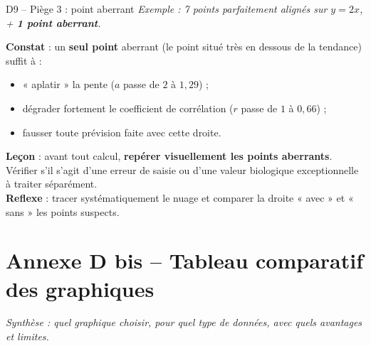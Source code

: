 \documentclass[11pt,a4paper]{article}
\begin{document}
\begin{vignetteAlerte}{D9 -- Piège 3 : point aberrant}
\emph{Exemple : 7 points parfaitement alignés sur $y = 2x$, + \textbf{1 point aberrant}.}
\begin{center}
\end{center}
\textbf{Constat} : un \textbf{seul point} aberrant (le point situé très en dessous de la tendance) suffit à :
\begin{itemize}[leftmargin=*,itemsep=1pt]
  \item « aplatir » la pente ($a$ passe de $2$ à $1{,}29$) ;
  \item dégrader fortement le coefficient de corrélation ($r$ passe de $1$ à $0{,}66$) ;
  \item fausser toute prévision faite avec cette droite.
\end{itemize}
\textbf{Leçon} : avant tout calcul, \textbf{repérer visuellement les points aberrants}. Vérifier s'il s'agit d'une erreur de saisie ou d'une valeur biologique exceptionnelle à traiter séparément.\\
\textbf{Reflexe} : tracer systématiquement le nuage et comparer la droite « avec » et « sans » les points suspects.
\end{vignetteAlerte}

\newpage

\section*{\color{biocolor}Annexe D bis -- Tableau comparatif des graphiques}
\emph{Synthèse : quel graphique choisir, pour quel type de données, avec quels avantages et limites.}
\end{document}
